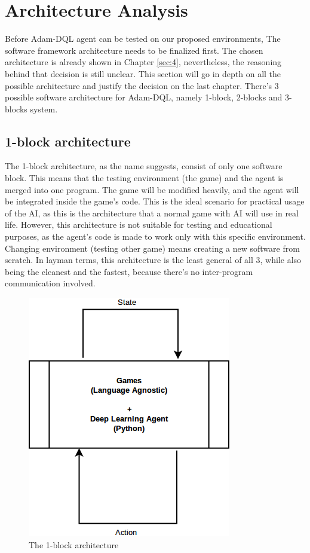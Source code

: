     \section{Architecture Analysis}
    
    Before Adam-DQL agent can be tested on our proposed environments, The software framework architecture needs to be finalized first. The chosen architecture is already shown in Chapter \ref{sec:4}, nevertheless, the reasoning behind that decision is still unclear. This section will go in depth on all the possible architecture and justify the decision on the last chapter. There's 3 possible software architecture for Adam-DQL, namely 1-block, 2-blocks and 3-blocks system.
    
    \subsection{1-block architecture}
         The 1-block architecture, as the name suggests, consist of only one software block. This means that the testing environment (the game) and the agent is merged into one program. The game will be modified heavily, and the agent will be integrated inside the game's code. This is the ideal scenario for practical usage of the AI, as this is the architecture that a normal game with AI will use in real life. However, this architecture is not suitable for testing and educational purposes, as the agent's code is made to work only with this specific environment. Changing environment (testing other game) means creating a new software from scratch. In layman terms, this architecture is the least general of all 3, while also being the cleanest and the fastest, because there's no inter-program communication involved.
         
        \begin{figure}[H]
            \centering
            \includegraphics[scale=0.5]{images/framework1block.png}
            \caption{The 1-block architecture}
            \label{fig:1block}
        \end{figure}
 
